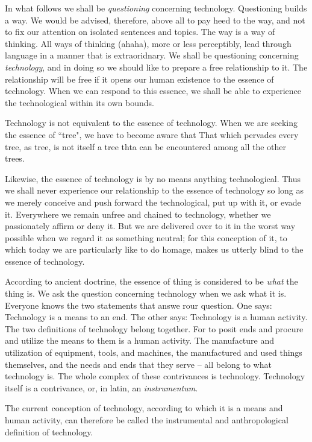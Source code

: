 In what follows we shall be \textit{questioning} concerning technology. Questioning builds a way. We would be advised, therefore, above all to pay heed to the way, and not to fix our attention on isolated sentences and topics. The way is a way of thinking. All ways of thinking (ahaha), more or less perceptibly, lead through language in a manner that is extraoridnary. We shall be questioning concerning \textit{technology}, and in doing so we should like to prepare a free relationship to it. The relationship will be free if it opens our human existence to the essence of technology. When we can respond to this essence, we shall be able to experience the technological within its own bounds.

Technology is not equivalent to the essence of technology. When we are seeking the essence of ``tree", we have to become aware that That which pervades every tree, as tree, is not itself a tree thta can be encountered among all the other trees.

Likewise, the essence of technology is by no means anything technological. Thus we shall never experience our relationship to the essence of technology so long as we merely conceive and push forward the technological, put up with it, or evade it. Everywhere we remain unfree and chained to technology, whether we passionately affirm or deny it. But we are delivered over to it in the worst way possible when we regard it as something neutral; for this conception of it, to which today we are particularly like to do homage, makes us utterly blind to the essence of technology.

According to ancient doctrine, the essence of thing is considered to be \textit{what} the thing is. We ask the question concerning technology when we ask what it is. Everyone knows the two statements that answe rour question. One says: Technology is a means to an end. The other says: Technology is a human activity. The two definitions of technology belong together. For to posit ends and procure and utilize the means to them is a human activity. The manufacture and utilization of equipment, tools, and machines, the manufactured and used things themselves, and the needs and ends that they serve -- all belong to what technology is. The whole complex of these contrivances is technology. Technology itself is a contrivance, or, in latin, an \textit{instrumentum}.

The current conception of technology, according to which it is a means and human activity, can therefore be called the instrumental and anthropological definition of technology.

